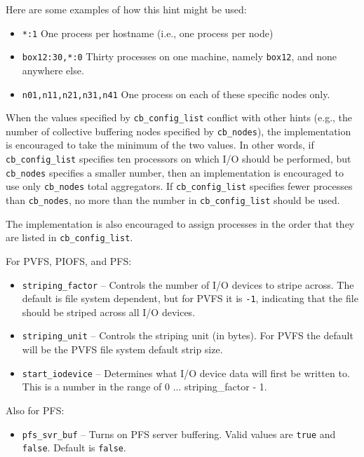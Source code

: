 Here are some examples of how this hint might be used:
\begin{itemize}
\item \texttt{*:1} One process per hostname (i.e., one process per node)
\item \texttt{box12:30,*:0} Thirty processes on one machine, namely
      \texttt{box12}, and none anywhere else.
\item \texttt{n01,n11,n21,n31,n41} One process on each of these specific
      nodes only.
\end{itemize}

When the values specified by \texttt{cb\_config\_list} conflict with
other hints (e.g., the number of collective buffering nodes specified by
\texttt{cb\_nodes}), the implementation is encouraged to take the minimum
of the two values.  In other words, if \texttt{cb\_config\_list} specifies
ten processors on which I/O should be performed, but \texttt{cb\_nodes}
specifies a smaller number, then an implementation is encouraged to use
only \texttt{cb\_nodes} total aggregators. If \texttt{cb\_config\_list}
specifies fewer processes than \texttt{cb\_nodes}, no more than the
number in \texttt{cb\_config\_list} should be used.

The implementation is also encouraged to assign processes in the order
that they are listed in \texttt{cb\_config\_list}.

For PVFS, PIOFS, and PFS:
\begin{itemize}
\item \texttt{striping\_factor} -- Controls the number of I/O devices to
stripe across.  The default is file system dependent, but for PVFS it is
\texttt{-1}, indicating that the file should be striped across all I/O
devices.
\item \texttt{striping\_unit} --  Controls the striping unit (in bytes).
For PVFS the default will be the PVFS file system default strip size.
\item \texttt{start\_iodevice} -- Determines what I/O device data will
first be written to.  This is a number in the range of 0 ...
striping\_factor - 1.
\end{itemize}

Also for PFS:
\begin{itemize}
\item \texttt{pfs\_svr\_buf} -- Turns on PFS server buffering.  Valid
values are \texttt{true} and \texttt{false}.  Default is \texttt{false}.
\end{itemize}

